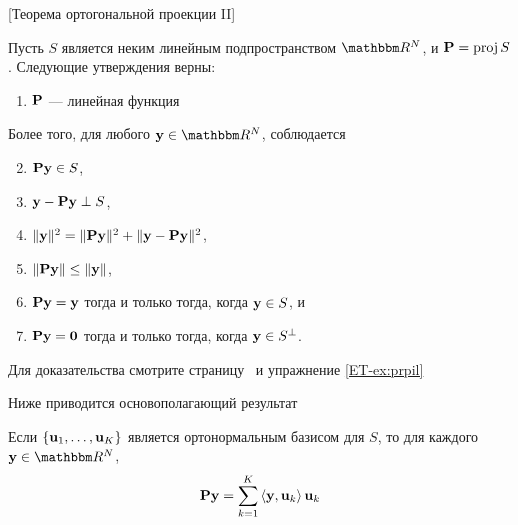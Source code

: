 \begin{frame}

    \vspace{2em}
    \Thm{\eqref{ET-t:opt2}}
    [Теорема ортогональной проекции II]
    
    Пусть $S$ является неким линейным подпространством $\RR^N$, и $\mathbf P = \operatorname{proj} S$.
    Следующие утверждения верны:
    \begin{enumerate}
        \item $\mathbf P$ --- линейная функция
    \end{enumerate}
    Более того, для любого $\boldy \in \RR^N$, соблюдается
    \begin{enumerate}
        \setcounter{enumi}{1}
        \item $\mathbf P {\mathbf y} \in S$,
        \item ${\mathbf y} - \mathbf P {\mathbf y} \perp S$,
        \item $\| {\mathbf y} \|^2 = \| \mathbf P {\mathbf y} \|^2 + \| {\mathbf y} - \mathbf P
            {\mathbf y} \|^2$,
        \item $\| \mathbf P {\mathbf y} \| \leq \| {\mathbf y} \|$,
        \item $\mathbf P {\mathbf y} = {\mathbf y}$ тогда и только тогда, когда ${\mathbf y} \in S$, и
        \item $\mathbf P {\mathbf y} = {\mathbf 0}$ тогда и только тогда, когда ${\mathbf y} \in
            S^{\perp}$.
    \end{enumerate}
    Для доказательства смотрите страницу~\pageref{ET-t:opt2} и
    упражнение \ref{ET-ex:prpil}
    
\end{frame}

\begin{frame}

    \vspace{2em}
    Ниже приводится основополагающий результат 
    
    \vspace{.7em}
    \Fact{\eqref{ET-fa:projon}}
    Если $\{{\mathbf u}_1, \ldots, {\mathbf u}_K\}$ является ортонормальным базисом для $S$, 
    то для каждого $\boldy \in \RR^N$,
    \begin{equation}
        \label{eq:projon}
        \mathbf P {\mathbf y} = \sum_{k=1}^K \left\langle{ {\mathbf y} ,  {\mathbf u} _k}\right\rangle {\mathbf u}_k
    \end{equation}
\end{frame}

